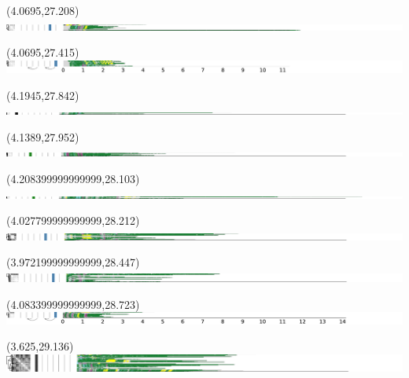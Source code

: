 \documentclass{article}
\begin{document}
\begin{textblock}{13}(4.0695,27.208)\includegraphics{haplotypes-constrained/18qtel_1-500K_1_12_12_rc-HG006.pdf}\end{textblock}
\begin{textblock}{13}(4.0695,27.415)\includegraphics{haplotypes-constrained/18qtel_1-500K_1_12_12_rc-HG007.pdf}\end{textblock}
\begin{textblock}{13}(4.1945,27.842)\includegraphics{haplotypes-constrained/chr19-HG001.pdf}\end{textblock}
\begin{textblock}{13}(4.1389,27.952)\includegraphics{haplotypes-constrained/chr19-HG003.pdf}\end{textblock}
\begin{textblock}{13}(4.208399999999999,28.103)\includegraphics{haplotypes-constrained/chr19-HG004.pdf}\end{textblock}
\begin{textblock}{13}(4.027799999999999,28.212)\includegraphics{haplotypes-constrained/chr19-HG005.pdf}\end{textblock}
\begin{textblock}{13}(3.972199999999999,28.447)\includegraphics{haplotypes-constrained/chr19-HG006.pdf}\end{textblock}
\begin{textblock}{13}(4.083399999999999,28.723)\includegraphics{haplotypes-constrained/chr19-HG007.pdf}\end{textblock}
\begin{textblock}{13}(3.625,29.136)\includegraphics{haplotypes-constrained/chr21-HG001.pdf}\end{textblock}
\end{document}
